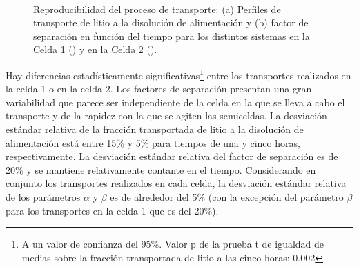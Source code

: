 \begin{figure}[H]
    \centering
    \\
    \caption[Reproducibilidad del proceso de transporte.]{Reproducibilidad del proceso de transporte: (a) Perfiles de transporte de litio a la disolución de alimentación  y (b) factor de separación en función del tiempo para los distintos sistemas en la Celda 1 (\protect\triangleupblck) y en la Celda 2 (\protect\triangleupwht).}
    \label{fig:RPM2}
\end{figure}
\clearpage
Hay diferencias estadísticamente significativas\footnote{A un valor de confianza del 95\%. Valor p de la prueba t de igualdad de medias sobre la fracción transportada de litio a las cinco horas: 0.002} entre los transportes realizados en la celda 1 o en la celda 2. Los factores de separación presentan una gran variabilidad que parece ser independiente de la celda en la que se lleva a cabo el transporte y de la rapidez con la que se agiten las semiceldas. La desviación estándar relativa de la fracción transportada de litio a la disolución de alimentación está entre 15\% y 5\% para tiempos de una y cinco horas, respectivamente. La desviación estándar relativa del factor de separación es de 20\% y se mantiene relativamente contante en el tiempo. Considerando en conjunto los transportes realizados en cada celda, la desviación estándar relativa de los parámetros $\alpha$ y $\beta$ es de alrededor del 5\% (con la excepción del parámetro $\beta$ para los transportes en la celda 1 que es del 20\%). 

